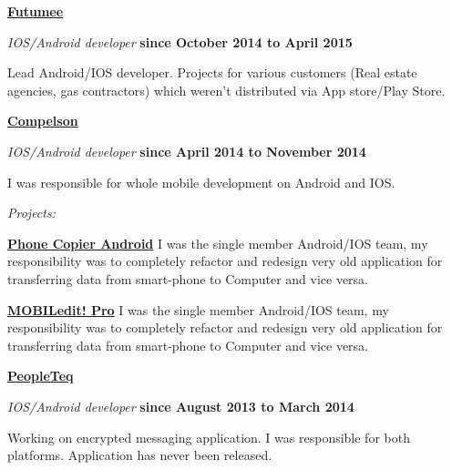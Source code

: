\documentclass[10pt]{article}
\newenvironment{outerlist}[0]%
        {\begin{itemize}}
        {\end{itemize}
         \vspace{-.6\baselineskip}}
\newenvironment{innerlist}[0]%
        {\begin{compactitem}}
        {\end{compactitem}}
\newcommand{\blankline}{\quad\pagebreak[2]}
\begin{document}
\href{http://www.futumee.com/}{\textbf{Futumee}}
\begin{outerlist}
  \item[] \textit{IOS/Android developer}%
          \hfill \textbf{since October 2014 to April 2015}
  \begin{innerlist}
    \item[] Lead Android/IOS developer. Projects for various customers (Real
estate agencies, gas contractors) which weren't distributed via App store/Play
Store.
  \end{innerlist}
\end{outerlist}

\blankline

\href{http://www.mobiledit.com/}{\textbf{Compelson}}
\begin{outerlist}
  \item[] \textit{IOS/Android developer}%
          \hfill \textbf{since April 2014 to November 2014}
  \begin{innerlist}
    \item[] I was responsible for whole mobile development on Android and IOS.
  \end{innerlist}
  \item[] \textit{Projects:}%
  \begin{innerlist}
	 	 \item[]  \href{https://play.google.com/store/apps/details?id=com.compelson.migrator&hl=sk}{\textbf{Phone Copier Android}} \newline
		 I was the single member Android/IOS team, my responsibility was to
completely refactor and redesign very old application for transferring data
from smart-phone to Computer and vice versa.
		\newline
	 	 \item[]  \href{https://itunes.apple.com/us/app/mobiledit!-pro/id547602472?mt=8}{\textbf{MOBILedit! Pro}} \newline
		 I was the single member Android/IOS team, my responsibility was to
completely refactor and redesign very old application for transferring data
from smart-phone to Computer and vice versa.
		 \newline
	 \end{innerlist}
\end{outerlist}

\blankline


\href{http://www.peopleteq.com/}{\textbf{PeopleTeq}}
\begin{outerlist}
  \item[] \textit{IOS/Android developer}%
          \hfill \textbf{since August 2013 to March 2014}
  \begin{innerlist}
    \item[] Working on encrypted messaging application. I was responsible for both
platforms. Application has never been released.
  \end{innerlist}
\end{outerlist}
\end{document}
